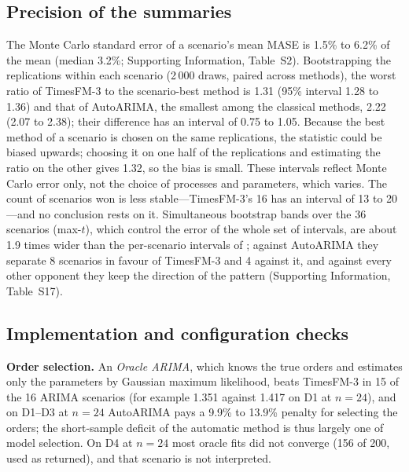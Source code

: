 \subsection{Precision of the summaries}
\label{sec:mcse}

The Monte Carlo standard error of a scenario's mean MASE is 1.5\% to 6.2\% of the mean (median 3.2\%;
Supporting Information, Table~S2). Bootstrapping the replications within each scenario (2\,000 draws, paired
across methods), the worst ratio of TimesFM-3 to the scenario-best method is 1.31 (95\% interval 1.28 to 1.36)
and that of AutoARIMA, the smallest among the classical methods, 2.22 (2.07 to 2.38); their difference has
an interval of 0.75 to 1.05. Because the best method of a scenario is chosen on the same replications, the
statistic could be biased upwards; choosing it on one half of the replications and estimating the ratio on
the other gives 1.32, so the bias is small. These intervals reflect Monte Carlo error only, not the choice
of processes and parameters, which  varies. The count of scenarios won is less
stable---TimesFM-3's 16 has an interval of 13 to 20---and no conclusion rests on it. Simultaneous
bootstrap bands over the 36 scenarios (max-$t$), which control the error of the whole set of intervals, are
about 1.9 times wider than the per-scenario intervals of ; against AutoARIMA they
separate 8 scenarios in favour of TimesFM-3 and 4 against it, and against every other opponent they keep
the direction of the pattern (Supporting Information, Table~S17).

\subsection{Implementation and configuration checks}
\label{sec:checks}

\textbf{Order selection.} An \emph{Oracle ARIMA}, which knows the true orders and estimates only the
parameters by Gaussian maximum likelihood, beats TimesFM-3 in 15 of the 16 ARIMA scenarios (for example 1.351
against 1.417 on D1 at $n = 24$), and on D1--D3 at $n = 24$ AutoARIMA pays a 9.9\% to 13.9\% penalty for
selecting the orders; the short-sample deficit of the automatic method is thus largely one of model
selection. On D4 at $n = 24$ most oracle fits did not converge (156 of 200, used as returned), and that scenario
is not interpreted.

